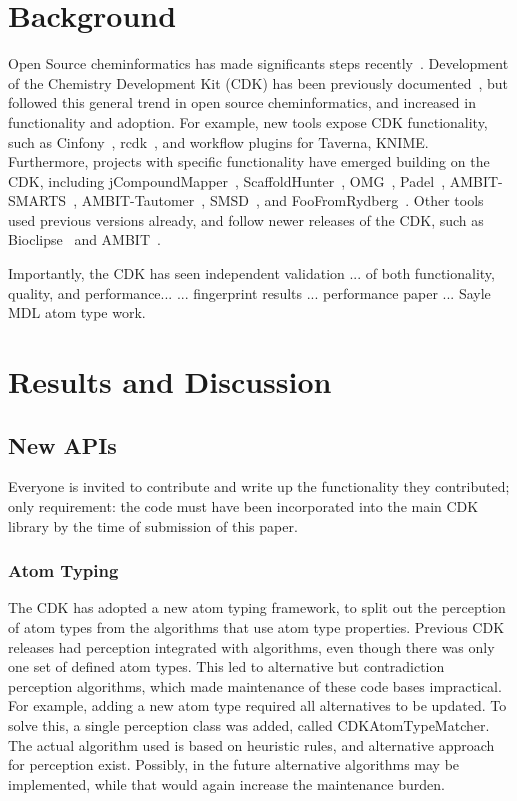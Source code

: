 \documentclass[10pt]{bmc_article}
\newenvironment{bmcformat}{\begin{raggedright}\baselineskip20pt\sloppy\setboolean{publ}{false}}{\end{raggedright}\baselineskip20pt\sloppy}
\begin{document}
\begin{bmcformat}
\section*{Background}

Open Source cheminformatics has made significants steps recently~\cite{OBoyle2011}.
Development of the Chemistry Development Kit (CDK) has been previously documented~\cite{Steinbeck2003,Steinbeck2006},
but followed this general trend in open source cheminformatics, and increased in functionality
and adoption. For example, new tools expose CDK functionality, such as Cinfony~\cite{OBoyle2008},
rcdk~\cite{}, and workflow plugins for Taverna\cite{Truszkowski2011}, KNIME\cite{Beisken2013}.
Furthermore, projects with specific functionality have emerged building on the CDK, including
jCompoundMapper~\cite{Hinselmann2011}, ScaffoldHunter~\cite{wetzel2009interactive}, OMG~\cite{Peironcely2012},
Padel~\cite{yap2011padel}, AMBIT-SMARTS~\cite{jeliazkova2011ambitsmarts}, AMBIT-Tautomer~\cite{kochev2013ambit},
SMSD~\cite{}, and FooFromRydberg~\cite{}. Other tools used previous versions already, and follow
newer releases of the CDK, such as Bioclipse~\cite{} and AMBIT~\cite{jeliazkova2011ambit}.

Importantly, the CDK has seen independent validation ... of both functionality, quality, and performance...
... fingerprint results ... performance paper ... Sayle MDL atom type work.

\section*{Results and Discussion}

\subsection*{New APIs}

Everyone is invited to contribute and write up the functionality they contributed;
only requirement: the code must have been incorporated into the main CDK library by the
time of submission of this paper.

  \subsubsection*{Atom Typing}
  
  The CDK has adopted a new atom typing framework, to split out the perception of atom types
  from the algorithms that use atom type properties. Previous CDK releases had perception
  integrated with algorithms, even though there was only one set of defined atom types.
  This led to alternative but contradiction perception algorithms, which made maintenance
  of these code bases impractical. For example, adding a new atom type required all alternatives
  to be updated.
  To solve this, a single perception class was added, called CDKAtomTypeMatcher. The actual
  algorithm used is based
  on heuristic rules, and alternative approach for perception exist. Possibly, in the future
  alternative algorithms may be implemented, while that would again increase the maintenance
  burden.


\end{bmcformat}
\end{document}
